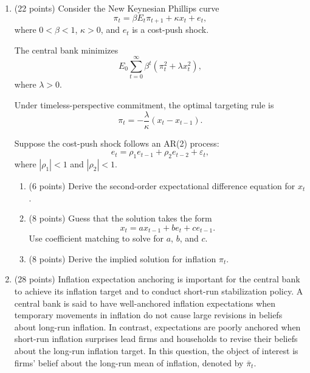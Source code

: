 \documentclass[12pt]{article}
\begin{document}
\begin{enumerate}[label=\arabic*.]
    \newpage
    \item (22 points) Consider the New Keynesian Phillips curve
    \begin{equation*}
        \pi_t = \beta E_t \pi_{t+1} + \kappa x_t + e_t,
    \end{equation*}
    where $0<\beta<1$, $\kappa>0$, and $e_t$ is a cost-push shock.
    
    The central bank minimizes
    \begin{equation*}
        E_0 \sum_{t=0}^{\infty} \beta^t
        \left( \pi_t^2 + \lambda x_t^2 \right),
    \end{equation*}
    where $\lambda>0$.
    
    Under timeless-perspective commitment, the optimal targeting rule is
    \begin{equation*}
        \pi_t = -\frac{\lambda}{\kappa}(x_t-x_{t-1}).
    \end{equation*}
    
    Suppose the cost-push shock follows an AR(2) process:
    \begin{equation*}
        e_t = \rho_1 e_{t-1} + \rho_2 e_{t-2} + \varepsilon_t,
    \end{equation*}
    where $|\rho_1|<1$ and $|\rho_2|<1$.
    
    \begin{enumerate}[label=(\alph*)]
        \item (6 points) Derive the second-order expectational difference equation for $x_t$.
        
        \item (8 points) Guess that the solution takes the form
        \begin{equation*}
            x_t = a x_{t-1} + b e_t + c e_{t-1}.
        \end{equation*}
        Use coefficient matching to solve for $a$, $b$, and $c$.
        
        \item (8 points) Derive the implied solution for inflation $\pi_t$.
    \end{enumerate}

    \newpage
    \item (28 points) Inflation expectation anchoring is important for the central bank to achieve its inflation target and to conduct short-run stabilization policy. A central bank is said to have well-anchored inflation expectations when temporary movements in inflation do not cause large revisions in beliefs about long-run inflation. In contrast, expectations are poorly anchored when short-run inflation surprises lead firms and households to revise their beliefs about the long-run inflation target. In this question, the object of interest is firms' belief about the long-run mean of inflation, denoted by $\bar{\pi}_t$.
    

\end{enumerate}
\end{document}
